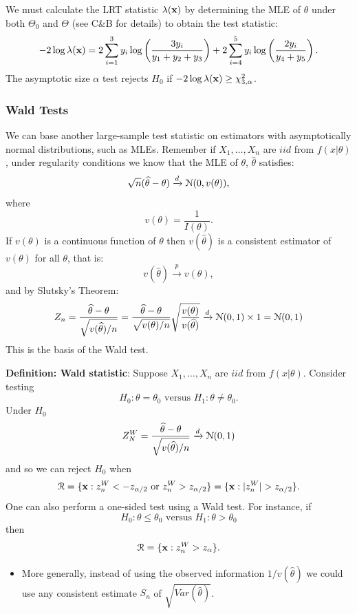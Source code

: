 \documentclass[11pt,]{article}
\newcommand{\Xndots}{X_1, \ldots, X_n}
\def\bx{{\bf x}}
\def\thetahat{{\widehat\theta}}
\def\Nsc{{\cal N}}
\def\Rsc{{\cal R}}
\begin{document}
We must calculate the LRT statistic \(\lambda(\bx)\) by determining the
MLE of \(\theta\) under both \(\Theta_0\) and \(\Theta\) (see C\&B for
details) to obtain the test statistic:
\[-2 \log \lambda(\bx) = 2 \sum_{i=1}^3 y_i \log\left( \frac{3 y_i}{y_1+y_2+y_3}\right) + 2 \sum_{i=4}^5 y_i \log\left( \frac{2 y_i}{y_4+y_5}\right).\]
The asymptotic size \(\alpha\) test rejects \(H_0\) if
\(-2 \log \lambda(\bx) \geq \chi^2_{3,\alpha}\).

\subsubsection{Wald Tests}

We can base another large-sample test statistic on estimators with
asymptotically normal distributions, such as MLEs. Remember if
\(\Xndots\) are \(iid\) from \(f(x|\theta)\), under regularity
conditions we know that the MLE of \(\theta\), \(\thetahat\) satisfies:
\[\sqrt{n}(\thetahat - \theta) \xrightarrow{d} \Nsc(0, v(\theta)),\]
where \[v(\theta) = \frac{1}{I(\theta)}.\] If \(v(\theta)\) is a
continuous function of \(\theta\) then \(v(\thetahat)\) is a consistent
estimator of \(v(\theta)\) for all \(\theta\), that is:
\[v(\thetahat) \xrightarrow{p} v(\theta),\] and by Slutsky's Theorem:
\[Z_n = \frac{\thetahat - \theta}{\sqrt{v(\thetahat)/n}} = 
\frac{\thetahat - \theta}{\sqrt{v(\theta)/n}}\sqrt{\frac{v(\theta)}{{v(\thetahat)}}} \xrightarrow{d} \Nsc(0,1)\times 1 = \Nsc(0,1)\]
This is the basis of the Wald test.

\noindent\textbf{Definition: Wald statistic}: Suppose \(\Xndots\) are
\(iid\) from \(f(x|\theta)\). Consider testing
\[H_0: \theta = \theta_0 \mbox{ versus } H_1: \theta \neq \theta_0.\]
Under \(H_0\)
\[Z_N^W = \frac{\thetahat - \theta}{\sqrt{v(\thetahat)/n}} \xrightarrow{d} \Nsc(0,1)\]
and so we can reject \(H_0\) when
\[\Rsc = \{\bx : z_n^W < -z_{\alpha/2} \mbox{ or } z_n^W > z_{\alpha/2}\} =  \{\bx : |z_n^W| > z_{\alpha/2} \}.\]
One can also perform a one-sided test using a Wald test. For instance,
if \[H_0: \theta \leq \theta_0 \mbox{ versus } H_1: \theta > \theta_0\]
then \[\Rsc = \{\bx : z_n^W > z_{\alpha}\}.\]

\begin{itemize}
\item More generally, instead of using the observed information $1/v(\thetahat)$ we could use any consistent estimate $S_n$ of $\sqrt{Var(\thetahat)}$.
\end{itemize}
\end{document}
